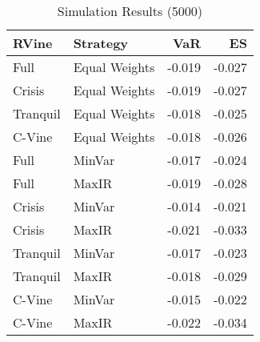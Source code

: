 \begin{table}

\caption{Simulation Results (5000)}
\centering
\begin{tabular}[t]{llrr}
\toprule
RVine & Strategy & VaR & ES\\
\midrule
Full & Equal Weights & -0.019 & -0.027\\
Crisis & Equal Weights & -0.019 & -0.027\\
Tranquil & Equal Weights & -0.018 & -0.025\\
C-Vine & Equal Weights & -0.018 & -0.026\\
Full & MinVar & -0.017 & -0.024\\
\addlinespace
Full & MaxIR & -0.019 & -0.028\\
Crisis & MinVar & -0.014 & -0.021\\
Crisis & MaxIR & -0.021 & -0.033\\
Tranquil & MinVar & -0.017 & -0.023\\
Tranquil & MaxIR & -0.018 & -0.029\\
\addlinespace
C-Vine & MinVar & -0.015 & -0.022\\
C-Vine & MaxIR & -0.022 & -0.034\\
\bottomrule
\end{tabular}
\end{table}

